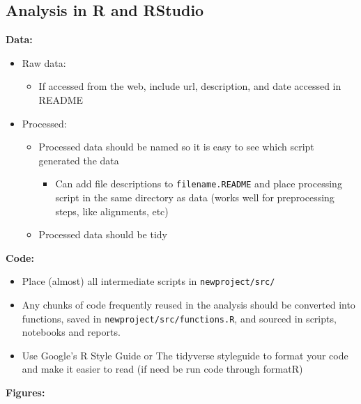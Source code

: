 \documentclass[openany]{book}
\providecommand{\tightlist}{%
  \setlength{\itemsep}{0pt}\setlength{\parskip}{0pt}}
\begin{document}
\hypertarget{analysis-in-r-and-rstudio}{%
\subsection{Analysis in R and RStudio}\label{analysis-in-r-and-rstudio}}

\textbf{Data:}

\begin{itemize}
\tightlist
\item
  Raw data:

  \begin{itemize}
  \tightlist
  \item
    If accessed from the web, include url, description, and date accessed in README
  \end{itemize}
\item
  Processed:

  \begin{itemize}
  \tightlist
  \item
    Processed data should be named so it is easy to see which script generated the data

    \begin{itemize}
    \tightlist
    \item
      Can add file descriptions to \texttt{filename.README} and place processing script in the same directory as data (works well for preprocessing steps, like alignments, etc)
    \end{itemize}
  \item
    Processed data should be tidy
  \end{itemize}
\end{itemize}

\textbf{Code:}

\begin{itemize}
\tightlist
\item
  Place (almost) all intermediate scripts in \texttt{newproject/src/}
\item
  Any chunks of code frequently reused in the analysis should be converted into functions, saved in \texttt{newproject/src/functions.R}, and sourced in scripts, notebooks and reports.\\
\item
  Use Google's R Style Guide or The tidyverse styleguide to format your code and make it easier to read (if need be run code through formatR)
\end{itemize}

\textbf{Figures:}
\end{document}
